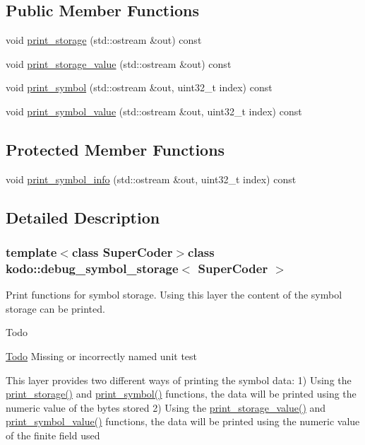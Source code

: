 \subsection*{Public Member Functions}
\begin{DoxyCompactItemize}
\item 
void \hyperlink{classkodo_1_1debug__symbol__storage_a966b0de6079fdd9afd1176ab06f6b136}{print\-\_\-storage} (std\-::ostream \&out) const 
\item 
void \hyperlink{classkodo_1_1debug__symbol__storage_a5ee36c99fd490bda549cdbbb8e3121af}{print\-\_\-storage\-\_\-value} (std\-::ostream \&out) const 
\item 
void \hyperlink{classkodo_1_1debug__symbol__storage_a0b08d0a81c0e1f52cd6cd198d0c126b9}{print\-\_\-symbol} (std\-::ostream \&out, uint32\-\_\-t index) const 
\item 
void \hyperlink{classkodo_1_1debug__symbol__storage_a52824ea0ffe5561a72d887c05ba4e1ff}{print\-\_\-symbol\-\_\-value} (std\-::ostream \&out, uint32\-\_\-t index) const 
\end{DoxyCompactItemize}
\subsection*{Protected Member Functions}
\begin{DoxyCompactItemize}
\item 
void \hyperlink{classkodo_1_1debug__symbol__storage_aa548aa16b1213158dcaed2a1518dd98a}{print\-\_\-symbol\-\_\-info} (std\-::ostream \&out, uint32\-\_\-t index) const 
\end{DoxyCompactItemize}


\subsection{Detailed Description}
\subsubsection*{template$<$class Super\-Coder$>$class kodo\-::debug\-\_\-symbol\-\_\-storage$<$ Super\-Coder $>$}

Print functions for symbol storage. Using this layer the content of the symbol storage can be printed. 

\begin{DoxyRefDesc}{Todo}
\item[\hyperlink{todo__todo000006}{Todo}]Missing or incorrectly named unit test\end{DoxyRefDesc}
This layer provides two different ways of printing the symbol data\-: 1) Using the \hyperlink{classkodo_1_1debug__symbol__storage_a966b0de6079fdd9afd1176ab06f6b136}{print\-\_\-storage()} and \hyperlink{classkodo_1_1debug__symbol__storage_a0b08d0a81c0e1f52cd6cd198d0c126b9}{print\-\_\-symbol()} functions, the data will be printed using the numeric value of the bytes stored 2) Using the \hyperlink{classkodo_1_1debug__symbol__storage_a5ee36c99fd490bda549cdbbb8e3121af}{print\-\_\-storage\-\_\-value()} and \hyperlink{classkodo_1_1debug__symbol__storage_a52824ea0ffe5561a72d887c05ba4e1ff}{print\-\_\-symbol\-\_\-value()} functions, the data will be printed using the numeric value of the finite field used

